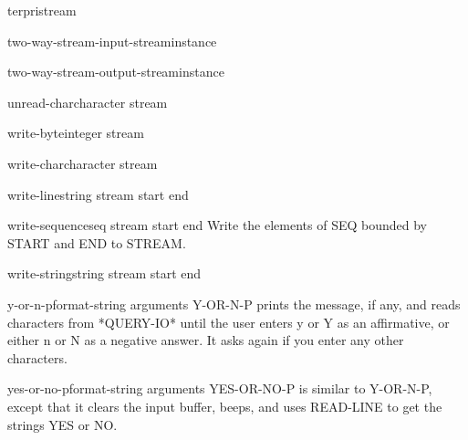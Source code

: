 \begin{function}{terpri}{\op stream}{}{}
  
\end{function}

\begin{function}{two-way-stream-input-stream}{instance}{}{}
  
\end{function}

\begin{function}{two-way-stream-output-stream}{instance}{}{}
  
\end{function}

\begin{function}{unread-char}{character \op stream}{}{}
  
\end{function}

\begin{function}{write-byte}{integer stream}{}{}
  
\end{function}

\begin{function}{write-char}{character \op stream}{}{}
  
\end{function}

\begin{function}{write-line}{string \op stream \key start end}{}{}
  
\end{function}

\begin{function}{write-sequence}{seq stream \key start end}{}{}
  Write the elements of SEQ bounded by START and END to STREAM.
\end{function}

\begin{function}{write-string}{string \op stream \key start end}{}{}
  
\end{function}

\begin{function}{y-or-n-p}{\op format-string \rest arguments}{}{}
  Y-OR-N-P prints the message, if any, and reads characters from
   *QUERY-IO* until the user enters y or Y as an affirmative, or either
   n or N as a negative answer. It asks again if you enter any other
   characters.
\end{function}

\begin{function}{yes-or-no-p}{\op format-string \rest arguments}{}{}
  YES-OR-NO-P is similar to Y-OR-N-P, except that it clears the
   input buffer, beeps, and uses READ-LINE to get the strings
   YES or NO.
\end{function}

